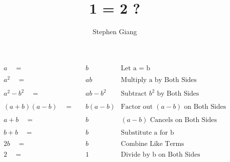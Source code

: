 \documentclass[12pt]{article}
\title{1 = 2 ?}
\author{Stephen Giang}
\begin{document}
	
\maketitle


\begin{align*}
    a \quad =& \quad b		
    &\text{Let a = b} \\\\
    a^{2} \quad =& \quad ab		
    &\text{Multiply a by Both Sides} \\\\
    a^{2} - b^{2} \quad =& \quad ab - b^{2} 
    &\text{Subtract $b^{2}$ by Both Sides} \\\\
    \left (a + b \right)\left (a - b \right) \quad =& \quad b\left (a - b \right)
    &\text{Factor out $\left (a - b \right)$ on Both Sides} \\\\
    a + b \quad =& \quad b
    &\text{$\left (a - b \right)$ Cancels on Both Sides} \\\\
    b + b \quad =& \quad b
    &\text{Substitute a for b} \\\\
    2b \quad =& \quad b 
    &\text{Combine Like Terms} \\\\
    2 \quad =& \quad 1 
    &\text{Divide by b on Both Sides} \\\\
\end{align*}
\end{document}

